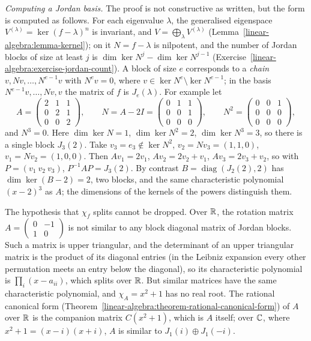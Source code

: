 \begin{example}\label{linear-algebra:example-jordan-computation}
\emph{Computing a Jordan basis.} The proof is not constructive as written, but the form is computed as follows. For each eigenvalue $\lambda$, the generalised eigenspace $V^{(\lambda)} =
\ker(f - \lambda)^n$ is invariant, and $V = \bigoplus_\lambda V^{(\lambda)}$ (Lemma~\ref{linear-algebra:lemma-kernel}); on it $N = f - \lambda$ is nilpotent, and the number of Jordan blocks of size
at least $j$ is $\dim\ker N^j - \dim\ker N^{j-1}$ (Exercise~\ref{linear-algebra:exercise-jordan-count}). A block of size $e$ corresponds to a \emph{chain} $v, Nv, \ldots, N^{e-1}v$ with
$N^ev = 0$, where $v \in \ker N^e \setminus \ker N^{e-1}$; in the basis $N^{e-1}v, \ldots, Nv, v$ the matrix of $f$ is $J_e(\lambda)$. For example let
\[
A = \begin{pmatrix}2 & 1 & 1\\ 0 & 2 & 1\\ 0 & 0 & 2\end{pmatrix}, \qquad N = A - 2I = \begin{pmatrix}0 & 1 & 1\\ 0 & 0 & 1\\ 0 & 0 & 0\end{pmatrix}, \qquad N^2 = \begin{pmatrix}0 & 0 & 1\\ 0 & 0 & 0\\ 0 & 0 & 0\end{pmatrix},
\]
and $N^3 = 0$. Here $\dim\ker N = 1$, $\dim\ker N^2 = 2$, $\dim\ker N^3 = 3$, so there is a single block $J_3(2)$. Take $v_3 = e_3 \notin \ker N^2$, $v_2 = Nv_3 = (1, 1, 0)$, $v_1 = Nv_2 = (1, 0, 0)$.
Then $Av_1 = 2v_1$, $Av_2 = 2v_2 + v_1$, $Av_3 = 2v_3 + v_2$, so with $P = (v_1\ v_2\ v_3)$, $P^{-1}AP = J_3(2)$. By contrast $B = \operatorname{diag}(J_2(2), 2)$ has $\dim\ker(B - 2) = 2$,
two blocks, and the same characteristic polynomial $(x - 2)^3$ as $A$; the dimensions of the kernels of the powers distinguish them.
\end{example}

\begin{counterexample}\label{linear-algebra:counterexample-jordan-real}
The hypothesis that $\chi_f$ splits cannot be dropped. Over $\mathbb{R}$, the rotation matrix
$A = \begin{pmatrix} 0 & -1 \\ 1 & 0 \end{pmatrix}$ is not similar to any block diagonal matrix of
Jordan blocks. Such a matrix is upper triangular, and the determinant of an upper triangular
matrix is the product of its diagonal entries (in the Leibniz expansion every other permutation
meets an entry below the diagonal), so its characteristic polynomial is $\prod_i(x - a_{ii})$,
which splits over $\mathbb{R}$. But similar matrices have the same characteristic polynomial, and
$\chi_A = x^2 + 1$ has no real root. The rational canonical form
(Theorem~\ref{linear-algebra:theorem-rational-canonical-form}) of $A$ over $\mathbb{R}$ is the companion
matrix $C(x^2 + 1)$, which is $A$ itself; over $\mathbb{C}$, where $x^2 + 1 = (x - i)(x + i)$, $A$ is
similar to $J_1(i) \oplus J_1(-i)$.
\end{counterexample}

